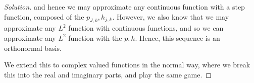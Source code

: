 \documentclass[10pt]{article}
\begin{document}
\begin{proof}[Solution]
and hence we may approximate any continuous function with a step function, composed of the $p_{J,k}, h_{j,k}$. However, we also know that we may approximate any $L^2$ function with continuous functions, and so we can approximate any $L^2$ function with the $p, h$. Hence, this sequence is an orthonormal basis.

We extend this to complex valued functions in the normal way, where we break this into the real and imaginary parts, and play the same game.





\end{proof}
\end{document}
